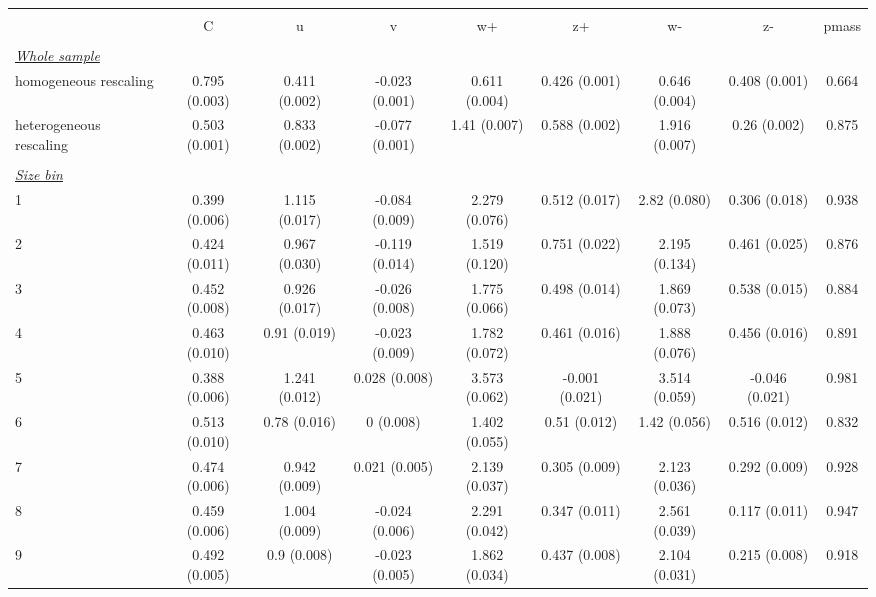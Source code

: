 
\begin{tabular}{@{\extracolsep{5pt}} l cccccccc} 
\\[-1.8ex]\hline 
\hline \\[-1.8ex] 
  & C & u & v & w+ & z+ & w- & z- & pmass \\ 
\hline \\[-1.8ex] 
\underline{{\it Whole sample}} &   &   &   &   &   &   &   &  \\ 
homogeneous rescaling & 0.795 (0.003) & 0.411 (0.002) & -0.023 (0.001) & 0.611 (0.004) & 0.426 (0.001) & 0.646 (0.004) & 0.408 (0.001) & 0.664 \\ 
heterogeneous rescaling & 0.503 (0.001) & 0.833 (0.002) & -0.077 (0.001) & 1.41 (0.007) & 0.588 (0.002) & 1.916 (0.007) & 0.26 (0.002) & 0.875 \\ 
 &   &   &   &   &   &   &   &  \\ 
\underline{{\it Size bin}} &   &   &   &   &   &   &   &  \\ 
1 & 0.399 (0.006) & 1.115 (0.017) & -0.084 (0.009) & 2.279 (0.076) & 0.512 (0.017) & 2.82 (0.080) & 0.306 (0.018) & 0.938 \\ 
2 & 0.424 (0.011) & 0.967 (0.030) & -0.119 (0.014) & 1.519 (0.120) & 0.751 (0.022) & 2.195 (0.134) & 0.461 (0.025) & 0.876 \\ 
3 & 0.452 (0.008) & 0.926 (0.017) & -0.026 (0.008) & 1.775 (0.066) & 0.498 (0.014) & 1.869 (0.073) & 0.538 (0.015) & 0.884 \\ 
4 & 0.463 (0.010) & 0.91 (0.019) & -0.023 (0.009) & 1.782 (0.072) & 0.461 (0.016) & 1.888 (0.076) & 0.456 (0.016) & 0.891 \\ 
5 & 0.388 (0.006) & 1.241 (0.012) & 0.028 (0.008) & 3.573 (0.062) & -0.001 (0.021) & 3.514 (0.059) & -0.046 (0.021) & 0.981 \\ 
6 & 0.513 (0.010) & 0.78 (0.016) & 0 (0.008) & 1.402 (0.055) & 0.51 (0.012) & 1.42 (0.056) & 0.516 (0.012) & 0.832 \\ 
7 & 0.474 (0.006) & 0.942 (0.009) & 0.021 (0.005) & 2.139 (0.037) & 0.305 (0.009) & 2.123 (0.036) & 0.292 (0.009) & 0.928 \\ 
8 & 0.459 (0.006) & 1.004 (0.009) & -0.024 (0.006) & 2.291 (0.042) & 0.347 (0.011) & 2.561 (0.039) & 0.117 (0.011) & 0.947 \\ 
9 & 0.492 (0.005) & 0.9 (0.008) & -0.023 (0.005) & 1.862 (0.034) & 0.437 (0.008) & 2.104 (0.031) & 0.215 (0.008) & 0.918 \\ 

\end{tabular}
